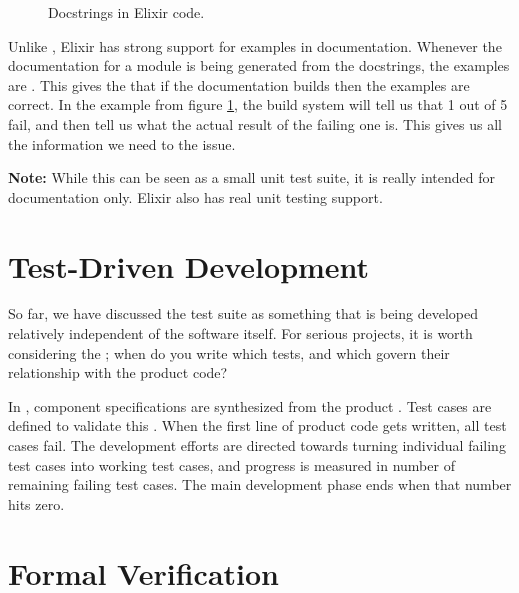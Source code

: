 \begin{figure}[tbp]
  \inputminted[ignorelexererrors=true]{elixir}{../src/elixir/test/docstring/Math.ex}
  \caption{Docstrings in Elixir code.}
  \label{fig:test:elixir:docstring}
\end{figure}

Unlike \csharp, Elixir has strong support for examples in documentation. Whenever the documentation for a module is being generated from the docstrings, the examples are . This gives the  that if the documentation builds  then the examples are correct. In the example from figure \ref{fig:test:elixir:docstring}, the build system will tell us that 1 out of 5  fail, and then tell us what the actual result of the failing one is. This gives us all the information we need to  the issue.

\textbf{Note:} While this can be seen as a small unit test suite, it is really intended for documentation only. Elixir also has real unit testing support.

\section{Test-Driven Development}

So far, we have discussed the test suite as something that is being developed relatively independent of the software  itself. For serious projects, it is worth considering the ; when do you write which tests, and which  govern their relationship with the product code?

In , component  specifications are synthesized from the product . Test cases are defined to validate this . When the first line of product code gets written, all test cases fail. The development efforts are directed towards turning individual failing test cases into working test cases, and progress is measured in number of remaining failing test cases. The main development phase ends when that number hits zero.

\section{Formal Verification}

